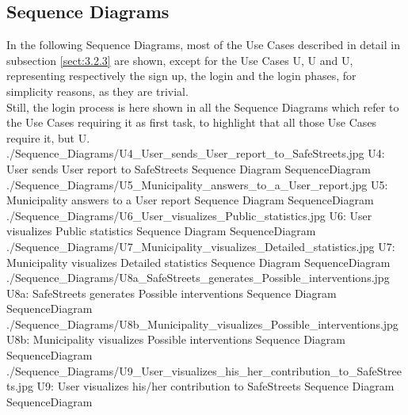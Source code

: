 \documentclass[../../../RASD.tex]{subfiles}
\begin{document}
\subsection{Sequence Diagrams\label{sect:3.2.4}}

In the following Sequence Diagrams, most of the Use Cases described in detail in subsection \ref{sect:3.2.3} are shown, except for the Use Cases {U}, {U} and {U}, representing respectively the  sign up, the  login and the  login phases, for simplicity reasons, as they are trivial.\\
Still, the login process is here shown in all the Sequence Diagrams which refer to the Use Cases requiring it as first task, to highlight that all those Use Cases require it, but {U}.\\

\image {10cm} {./Sequence_Diagrams/U4_User_sends_User_report_to_SafeStreets.jpg} {U4: User sends User report to SafeStreets Sequence Diagram} {SequenceDiagram}
\image {8cm} {./Sequence_Diagrams/U5_Municipality_answers_to_a_User_report.jpg} {U5: Municipality answers to a User report Sequence Diagram} {SequenceDiagram}
\image {7cm} {./Sequence_Diagrams/U6_User_visualizes_Public_statistics.jpg} {U6: User visualizes Public statistics Sequence Diagram} {SequenceDiagram}
\image {8cm} {./Sequence_Diagrams/U7_Municipality_visualizes_Detailed_statistics.jpg} {U7: Municipality visualizes Detailed statistics Sequence Diagram} {SequenceDiagram}
\image {4cm} {./Sequence_Diagrams/U8a_SafeStreets_generates_Possible_interventions.jpg} {U8a: SafeStreets generates Possible interventions Sequence Diagram} {SequenceDiagram}
\image {4cm} {./Sequence_Diagrams/U8b_Municipality_visualizes_Possible_interventions.jpg} {U8b: Municipality visualizes Possible interventions Sequence Diagram} {SequenceDiagram}
\image {6cm} {./Sequence_Diagrams/U9_User_visualizes_his_her_contribution_to_SafeStreets.jpg} {U9: User visualizes his/her contribution to SafeStreets Sequence Diagram} {SequenceDiagram} 
\end{document}
